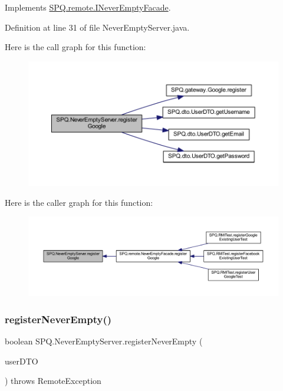 Implements \mbox{\hyperlink{interface_s_p_q_1_1remote_1_1_i_never_empty_facade_a93f3250c09a26fdb1d65219599dfd542}{S\+P\+Q.\+remote.\+I\+Never\+Empty\+Facade}}.



Definition at line 31 of file Never\+Empty\+Server.\+java.

Here is the call graph for this function\+:
\nopagebreak
\begin{figure}[H]
\begin{center}
\leavevmode
\includegraphics[width=350pt]{class_s_p_q_1_1_never_empty_server_ac97355451c02fc378cb5d8f33f442ce6_cgraph}
\end{center}
\end{figure}
Here is the caller graph for this function\+:
\nopagebreak
\begin{figure}[H]
\begin{center}
\leavevmode
\includegraphics[width=350pt]{class_s_p_q_1_1_never_empty_server_ac97355451c02fc378cb5d8f33f442ce6_icgraph}
\end{center}
\end{figure}
\mbox{\label{class_s_p_q_1_1_never_empty_server_ae52815c925e04018d6a1b2742d605063}} 
\subsubsection{\texorpdfstring{register\+Never\+Empty()}{registerNeverEmpty()}}
{\footnotesize\ttfamily boolean S\+P\+Q.\+Never\+Empty\+Server.\+register\+Never\+Empty (\begin{DoxyParamCaption}\item[{\mbox{\hyperlink{class_s_p_q_1_1dto_1_1_user_d_t_o}{User\+D\+TO}}}]{user\+D\+TO }\end{DoxyParamCaption}) throws Remote\+Exception}



